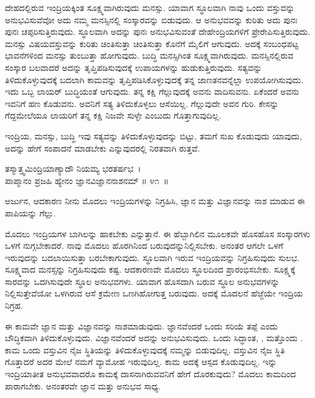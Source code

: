 ದೇಹದಲ್ಲಿರುವ ಇಂದ್ರಿಯಕ್ಕಿಂತ ಸೂಕ್ಷ್ಮವಾಗಿರುವುದು ಮನಸ್ಸು. ಯಾವಾಗ ಸ್ಥೂಲವಾಗಿ ನಾವು ಒಂದು ವಸ್ತುವನ್ನು ಅನುಭವಿಸುವೆವೋ ಅದು ನಮ್ಮ ಮನಸ್ಸಿನಲ್ಲಿ ಸಂಸ್ಕಾರವನ್ನು ಬಿಡುವುದು. ಆ ಅನುಭವವನ್ನು ಕುರಿತು ಅದು ಪುನಃ ಪುನಃ ಚಪ್ಪರಿಸುತ್ತಿರುವುದು. ಸ್ಥೂಲವಾಗಿ ಅದನ್ನು ಪುನಃ ಅನುಭವಿಸುವಂತೆ ದೇಹೇಂದ್ರಿಯಗಳಿಗೆ ಪ್ರೇರೇಪಿಸುತ್ತಿರುವುದು. ಮನಸ್ಸು ವಿಷಯವಸ್ತುವನ್ನು ಕುರಿತು ಚಿಂತಿಸುತ್ತಾ ಚಿಂತಿಸುತ್ತಾ ಕೊನೆಗೆ ಮೈಲಿಗೆ ಆಗುವುದು. ಅದಕ್ಕೆ ಸಂಬಂಧಪಟ್ಟ ಭಾವನೆಗಳಿಂದ ಮನಸ್ಸು ತುಂಬುತ್ತಾ ಹೋಗುವುದು. ಬುದ್ಧಿ ಮನಸ್ಸಿಗಿಂತ ಸೂಕ್ಷ್ಮವಾಗಿರುವುದು. ಮನಸ್ಸಿನಲ್ಲಿರುವ ಸಂಸ್ಕಾರ ಬಲವಾದರೆ ಅದನ್ನು ತೃಪ್ತಿಪಡಿಸುವುದಕ್ಕೆ ಉಪಾಯಗಳನ್ನು ಹುಡುಕುತ್ತಿರುವುದು. ಸತ್ಯವನ್ನು ತಿಳಿದುಕೊಳ್ಳುವುದಕ್ಕೆ ಬದಲಾಗಿ ಕಾಮವನ್ನು ತೃಪ್ತಿಪಡಿಸಿಕೊಳ್ಳುವುದಕ್ಕೆ ತನ್ನ ಜಾಣತನವನ್ನೆಲ್ಲಾ ಉಪಯೋಗಿಸುವುದು. ಇದು ಒಬ್ಬ ಲಾಯರ್ ಬುದ್ಧಿಯಂತೆ ಆಗುವುದು. ತನ್ನ ಕಕ್ಷಿ ಗೆಲ್ಲುವುದಕ್ಕೆ ಅವನು ವಾದಿಸುವನು. ಏಕೆಂದರೆ ಅವನು ಇವನಿಗೆ ಹಣ ಕೊಡುವನು. ಅವನಿಗೆ ಸತ್ಯ ತಿಳಿದುಕೊಳ್ಳಲು ಆಸೆಯಿಲ್ಲ. ಗೆಲ್ಲುವುದೇ ಅವನ ಗುರಿ. ಕೇಸನ್ನು ಗೆದ್ದಮೇಲೆಯೂ ಲಾಯರಿಗೆ ತನ್ನ ಕಕ್ಷಿ ನಿಜವೇ ಸುಳ್ಳೇ ಎಂಬುದು ಗೊತ್ತಾಗುವುದಿಲ್ಲ.

ಇಂದ್ರಿಯ, ಮನಸ್ಸು, ಬುದ್ಧಿ ಇವು ಸತ್ಯವನ್ನು ತಿಳಿದುಕೊಳ್ಳುವುದನ್ನು ಬಿಟ್ಟು, ತಮಗೆ ಸುಖ ಕೊಡುವುದು ಯಾವುದು, ಅದನ್ನು ಹೇಗೆ ಸಂಪಾದನೆ ಮಾಡಬೇಕು ಎನ್ನುವುದರಲ್ಲಿ ನಿರತವಾಗಿ ರುತ್ತವೆ.

\begin{shloka}
ತಸ್ಮಾತ್ತ್ವಮಿಂದ್ರಿಯಾಣ್ಯಾದೌ ನಿಯಮ್ಯ ಭರತರ್ಷಭ~।\\ಪಾಪ್ಮಾನಂ ಪ್ರಜಹಿ ಹ್ಯೇನಂ ಜ್ಞಾನವಿಜ್ಞಾನನಾಶನಮ್ \hfill॥ ೪೧~॥
\end{shloka}

\begin{artha}
ಅರ್ಜುನ, ಆದಕಾರಣ ನೀನು ಮೊದಲು ಇಂದ್ರಿಯಗಳನ್ನು ನಿಗ್ರಹಿಸಿ, ಜ್ಞಾನ ಮತ್ತು ವಿಜ್ಞಾನವನ್ನು ನಾಶ ಮಾಡುವ ಈ ಪಾಪಿಯನ್ನು ಗೆಲ್ಲು.
\end{artha}

ಮೊದಲು ಇಂದ್ರಿಯಗಳ ಬಾಗಿಲನ್ನು ಹಾಕಬೇಕು ಎನ್ನುತ್ತಾನೆ. ಈ ಹೆಬ್ಬಾಗಿಲಿನ ಮೂಲಕವೇ ಹೊಸಹೊಸ ಸಂಸ್ಕಾರಗಳು ಒಳಗೆ ನುಗ್ಗಬೇಕಾದರೆ. ನಾವು ಮೊದಲು ಹೊರಗಿನಿಂದ ಬರುವುದನ್ನು\break ನಿಲ್ಲಿಸಬೇಕು. ಅನಂತರ ಆಗಲೇ ಒಳಗೆ ಇರುವುದನ್ನು ಬದಲಾಯಿಸುತ್ತಾ ಬರಬೇಕಾಗುವುದು. ಸ್ಥೂಲವಾಗಿ ಇರುವ ಇಂದ್ರಿಯವನ್ನು ನಿಗ್ರಹಿಸುವುದು ಸುಲಭ. ಸೂಕ್ಷ್ಮವಾದ ಮನಸ್ಸನ್ನು ನಿಗ್ರಹಿಸುವುದು ಕಷ್ಟ. ಆದಕಾರಣವೇ ಮೊದಲು ಸ್ಥೂಲದಿಂದ ಪ್ರಾರಂಭಿಸಬೇಕು. ಸೂಕ್ಷ್ಮಕ್ಕೆ ಸಾರವನ್ನು ಒದಗಿಸುವುದೇ ಸ್ಥೂಲ ಅನುಭವಗಳು. ಯಾವಾಗ ಹೊಸದಾಗಿ ಬರುವ ಸ್ಥೂಲ ಅನುಭವಗಳನ್ನು ನಿಲ್ಲಿಸುತ್ತೇವೆಯೋ ಒಳಗಿರುವ ಆಸೆ ಕ್ರಮೇಣ ಒಣಗಿಹೋಗುತ್ತ ಬರುವುದು. ಅದಕ್ಕೆ ಮೊದಲನೆ ಹೆಜ್ಜೆಯೇ ಇಂದ್ರಿಯ ನಿಗ್ರಹ.

ಈ ಕಾಮವೇ ಜ್ಞಾನ ಮತ್ತು ವಿಜ್ಞಾನವನ್ನು ನಾಶಮಾಡುವುದು. ಜ್ಞಾನವೆಂದರೆ ಒಂದು ಸರಿಯೆ ತಪ್ಪೆ ಎಂದು ಬೌದ್ಧಿಕವಾಗಿ ತಿಳಿದುಕೊಳ್ಳುವುದು. ವಿಜ್ಞಾನವೆಂದರೆ ಅದನ್ನು ಅನುಭವಿಸುವುದು. ಒಂದು ಸಿದ್ಧಾಂತ, , ಮತ್ತೊಂದು . ಕಾಮ ಒಂದು ವಸ್ತುವಿನ ನೈಜ ಸ್ಥಿತಿಯನ್ನು ತಿಳಿದುಕೊಳ್ಳುವುದಕ್ಕೆ ನಮ್ಮನ್ನು ಬಿಡುವುದಿಲ್ಲ. ವಸ್ತುವಿನ ನೈಜ ಸ್ಥಿತಿ ಗೊತ್ತಾದರೆ ಅದರ ಮೇಲೆ ನಮಗೆ ವ್ಯಾಮೋಹ ಇರುವುದಿಲ್ಲ. ಕಾಮ ಅದಕ್ಕೆ ಆಸ್ಪದ ಕೊಡುವುದಿಲ್ಲ. ಇನ್ನು ಇಂದ್ರಿಯಾತೀತ ಅನುಭವವಾದರೊ ಕಾಮಕ್ಕೆ ದಾಸನಾಗಿರುವವನಿಗೆ ಹೇಗೆ ದೊರಕುವುದು? ಮೊದಲು ಕಾಮದಿಂದ ಪಾರಾಗಬೇಕು. ಅನಂತರವೇ ಜ್ಞಾನ ಮತ್ತು ಅನುಭವ ಸಾಧ್ಯ.

